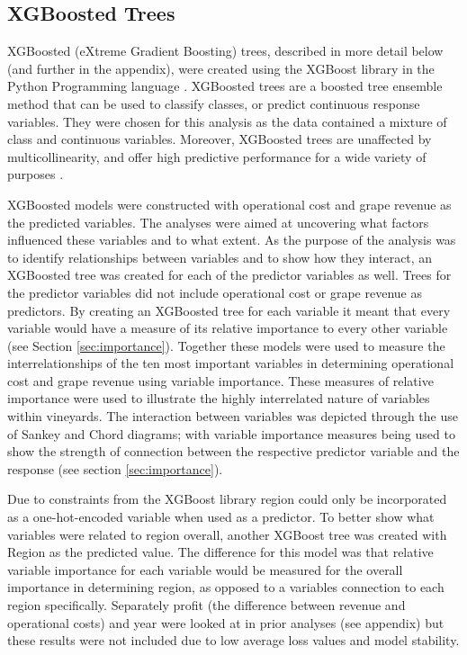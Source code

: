 \documentclass[review,12pt,authoryear]{elsarticle}
\begin{document}
\begin{linenumbers}
\subsection{XGBoosted Trees}
XGBoosted (eXtreme Gradient Boosting) trees, described in more detail below (and further in the appendix), were created using the XGBoost library \citep{chenXGBoostScalableTree2016} in the Python Programming language \citep{g.vanrossumPythonTutorialTechnical1995}. XGBoosted trees are a boosted tree ensemble method that can be used to classify classes, or predict continuous response variables. They were chosen for this analysis as the data contained a mixture of class and continuous variables. Moreover, XGBoosted trees are unaffected by multicollinearity, and offer high predictive performance for a wide variety of purposes \citep{chenXGBoostScalableTree2016}.
\par
XGBoosted models were constructed with operational cost and grape revenue as the predicted variables. The analyses were aimed at uncovering what factors influenced these variables and to what extent. As the purpose of the analysis was to identify relationships between variables and to show how they interact, an XGBoosted tree was created for each of the predictor variables as well. Trees for the predictor variables did not include operational cost or grape revenue as predictors. By creating an XGBoosted tree for each variable it meant that every variable would have a measure of its relative importance to every other variable (see Section \ref{sec:importance}). Together these models were used to measure the interrelationships of the ten most important variables in determining operational cost and grape revenue using variable importance. These measures of relative importance were used to illustrate the highly interrelated nature of variables within vineyards. The interaction between variables was depicted through the use of Sankey and Chord diagrams; with variable importance measures being used to show the strength of connection between the respective predictor variable and the response (see section \ref{sec:importance}).
\par
Due to constraints from the XGBoost library region could only be incorporated as a one-hot-encoded variable when used as a predictor. To better show what variables were related to region overall, another XGBoost tree was created with Region as the predicted value. The difference for this model was that relative variable importance for each variable would be measured for the overall importance in determining region, as opposed to a variables connection to each region specifically. Separately profit (the difference between revenue and operational costs) and year were looked at in prior analyses (see appendix) but these results were not included due to low average loss values and model stability.

\end{linenumbers}
\end{document}
